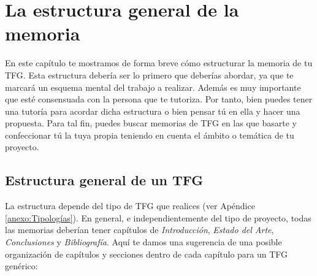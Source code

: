 \chapter{La estructura general de la memoria}
\label{cap:EstructuraMemoria}

En este capítulo te mostramos de forma breve cómo estructurar la memoria de tu TFG. Esta estructura debería ser lo primero que deberías abordar, ya que te marcará un esquema mental del trabajo a realizar. Además es muy importante que esté consensuada con la persona que te tutoriza. Por tanto, bien puedes tener una tutoría para acordar dicha estructura o bien pensar tú en ella y hacer una propuesta. Para tal fin, puedes buscar memorias de TFG en las que basarte y confeccionar tú la tuya propia teniendo en cuenta el ámbito o temática de tu proyecto.

\section{Estructura general de un TFG}

La estructura depende del tipo de TFG que realices (ver Apéndice \ref{anexo:Tipologías}). En general, e independientemente del tipo de proyecto, todas las memorias deberían tener capítulos de \textit{Introducción}, \textit{Estado del Arte}, \textit{Conclusiones} y \textit{Bibliografía}. Aquí te damos una sugerencia de una posible organización de capítulos y secciones dentro de cada capítulo para un TFG genérico:

